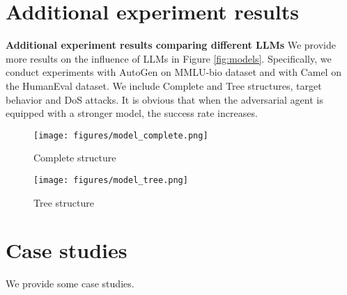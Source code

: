 \section{Additional experiment results} \label{app:exp result}

\textbf{Additional experiment results comparing different LLMs} We provide more results on the influence of LLMs in Figure \ref{fig:models}. Specifically, we conduct experiments with AutoGen on MMLU-bio dataset and with Camel on the HumanEval dataset. We include Complete and Tree structures, target behavior and DoS attacks. It is obvious that when the adversarial agent is equipped with a stronger model, the success rate increases.


\begin{figure*}[h]
    \centering
    
    \begin{subfigure}[b]{0.48\linewidth} %
        \centering
        \texttt{[image: figures/model\_complete.png]} %
        \caption{Complete structure}
        \label{fig:subfig1}
    \end{subfigure}
    \begin{subfigure}[b]{0.48\linewidth} %
        \centering
        \texttt{[image: figures/model\_tree.png]} %
        \caption{Tree structure}
        \label{fig:subfig2}
    \end{subfigure}
    
    \caption{Performance comparison for different LLMs.}
    \label{fig:models}
\end{figure*}

\section{Case studies}
We provide some case studies.

